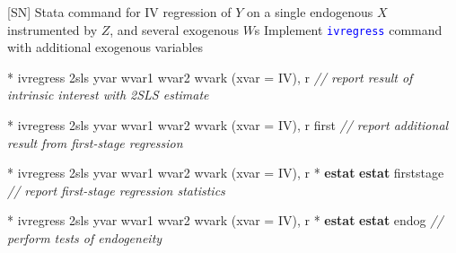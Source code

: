 \documentclass[
  10pt,
  ignorenonframetext,
]{beamer}
\newenvironment{Shaded}{\begin{snugshade}}{\end{snugshade}}
\newcommand{\CommentTok}[1]{\textcolor[rgb]{0.56,0.35,0.01}{\textit{#1}}}
\newcommand{\FunctionTok}[1]{\textcolor[rgb]{0.00,0.00,0.00}{#1}}
\newcommand{\KeywordTok}[1]{\textcolor[rgb]{0.13,0.29,0.53}{\textbf{#1}}}
\newcommand{\NormalTok}[1]{#1}
\begin{document}
\begin{frame}[fragile]{{[}SN{]} Stata command for IV regression of \(Y\)
on a single endogenous \(X\) instrumented by \(Z\), and several
exogenous \(W\)s}
\protect\hypertarget{sn-stata-command-for-iv-regression-of-y-on-a-single-endogenous-x-instrumented-by-z-and-several-exogenous-ws}{}
Implement \textcolor{blue}{\texttt{ivregress}} command with additional
exogenous variables

\small

\begin{Shaded}
\begin{Highlighting}[]
\NormalTok{* ivregress 2sls yvar wvar1 wvar2 wvark (xvar = IV), }\FunctionTok{r}
\CommentTok{// report result of intrinsic interest with 2SLS estimate}
\end{Highlighting}
\end{Shaded}

\begin{Shaded}
\begin{Highlighting}[]
\NormalTok{* ivregress 2sls yvar wvar1 wvar2 wvark (xvar = IV), }\FunctionTok{r}\NormalTok{ first}
\CommentTok{// report additional result from first{-}stage regression}
\end{Highlighting}
\end{Shaded}

\begin{Shaded}
\begin{Highlighting}[]
\NormalTok{* ivregress 2sls yvar wvar1 wvar2 wvark (xvar = IV), }\FunctionTok{r}
\NormalTok{* }\KeywordTok{estat} \KeywordTok{estat}\NormalTok{ firststage}
\CommentTok{// report first{-}stage regression statistics}
\end{Highlighting}
\end{Shaded}

\begin{Shaded}
\begin{Highlighting}[]
\NormalTok{* ivregress 2sls yvar wvar1 wvar2 wvark (xvar = IV), }\FunctionTok{r}
\NormalTok{* }\KeywordTok{estat} \KeywordTok{estat}\NormalTok{ endog}
\CommentTok{// perform tests of endogeneity}
\end{Highlighting}
\end{Shaded}
\end{frame}
\end{document}
